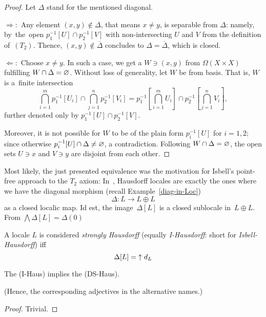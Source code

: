 \begin{proof}
  Let $\Delta$ stand for the mentioned diagonal.

  $\Rightarrow:$ Any element $(x, y)\not\in \Delta$, that means $x \ne y$, is
  separable from $\Delta$:
  namely, by~the~open $p_1^{-1}[U] \cap p_2^{-1}[V]$ with non-intersecting $U$
  and $V$ from the definition of~$(T_2)$.
  Thence, $(x, y)\not\in \overline{\Delta}$ concludes to $\Delta =
  \overline{\Delta}$, which is closed.

  $\Leftarrow:$ Choose $x \ne y$.
  In such a case, we get a $W\owns (x, y)$ from $\Omega(X\times X)$ fulfilling
  $W \cap \Delta = \varnothing$.
  Without loss of generality, let $W$ be from basis.
  That is, $W$ is a~finite intersection
  \[
    \bigcap_{i=1}^m p_1^{-1}[U_i] \cap \bigcap_{j=1}^n p_2^{-1}[V_i] =
    p_1^{-1}[\bigcap_{i=1}^m U_i] \cap p_2^{-1}[\bigcap_{j=1}^n V_i],
  \]
  further denoted only by $p_1^{-1}[U] \cap p_2^{-1}[V]$.

  Moreover, it is not possible for $W$ to be of the plain form $p_i^{-1}[U]$
  for $i = 1, 2$;
  since otherwise $p_i^{-1}[U] \cap \Delta \ne \varnothing$, a contradiction.
  Following $W \cap \Delta = \varnothing$, the open sets $U\owns x$ and $V\owns y$
  are disjoint from each other.
\end{proof}

Most likely, the just presented equivalence was the motivation for Isbell's
point-free approach to the $T_2$ axiom:
In~\cite{isbell72}, Hausdorff locales are exactly the ones where we have the
diagonal morphism (recall Example~\ref{diag-in-Loc})
\[
  \Delta\colon L \to L \oplus L
\]
as a closed localic map.
Id est, the image~$\Delta[L]$ is a closed sublocale in~$L \oplus L$.
From $\bigwedge \Delta[L] = \Delta(0)$

\begin{framed}
  \begin{df}[I-Haus]
    A locale $L$ is considered \emph{strongly Hausdorff\/} (equally
    \emph{I-Hausdorff}: short for \emph{Isbell-Hausdorff}) iff
    \[
      \Delta[L] = \left\uparrow\right. d_L
    \]
  \end{df}
\end{framed}

\begin{prop}
  The (I-Haus) implies the (DS-Haus).
\end{prop}
(Hence, the corresponding adjectives in the alternative names.)
\begin{proof}
  Trivial.
\end{proof}
